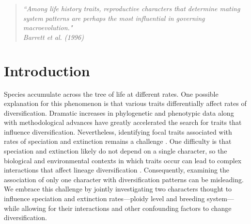 \begin{quote}
\em{``Among life history traits, reproductive characters that determine mating system patterns are perhaps the most influential in governing macroevolution." 
}
\\
\hspace*{\fill}\rm{ Barrett et al. (1996)}
\end{quote}

\section{Introduction}

Species accumulate across the tree of life at different rates. 
One possible explanation for this phenomenon is that various traits differentially affect rates of diversification. %
Dramatic increases in phylogenetic and phenotypic data along with methodological advances have greatly accelerated the search for traits that influence diversification. 
Nevertheless, identifying focal traits associated with rates of speciation and extinction remains a challenge \citep[\eg][]{maddison_2015, rabosky_2015, beaulieu_2016, rabosky_2017}. 
One difficulty is that speciation and extinction likely do not depend on a single character, so the biological and environmental contexts in which traits occur can lead to complex interactions that affect lineage diversification \citep{beaulieu_2016, caetano_2018, herrera_2018}.
Consequently, examining the association of only one character with diversification patterns can be misleading. 
We embrace this challenge by jointly investigating two characters thought to influence speciation and extinction rates---ploidy level and breeding system---while allowing for their interactions and other confounding factors to change diversification.

